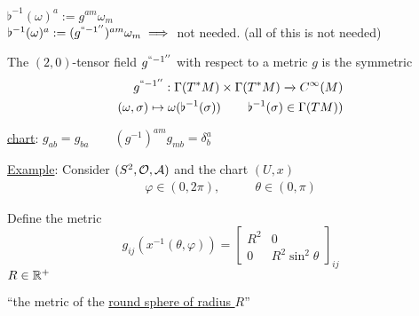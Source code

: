 $\flat^{-1}(\omega)^a := g^{am}\omega_m$ \\
$\flat^{-1}(\omega)^a := (g^{``-1''})^{am}\omega_m \implies$ not needed. (all of this is not needed)

\begin{definition}
The $(2,0)$-tensor field $g^{``-1''}$ with respect to a metric $g$ is the symmetric
\begin{align*}
  g^{``-1''} : \Gamma(T^*M) \times \Gamma(T^*M) \xrightarrow{ ~ } C^{\infty}(M) \\
  (\omega, \sigma) \mapsto \omega(\flat^{-1}(\sigma)) \quad \quad \, \flat^{-1}(\sigma) \in \Gamma(TM))
\end{align*}

\underline{chart}: $g_{ab} = g_{ba} \quad \quad (g^{-1})^{am} g_{mb} = \delta^a_b$
\end{definition}

\underline{Example}: Consider $(S^2, \mathcal{O}, \mathcal{A})$ and the chart $(U,x)$
\begin{align*}
\varphi \in (0,2\pi), & \quad \quad \theta \in (0,\pi)
\end{align*}

Define the metric \\
\[
g_{ij}(x^{-1}(\theta,\varphi)) = \left[ \begin{matrix} R^2 & 0 \\
    0 & R^2\sin^2{\theta} \end{matrix} \right]_{ij}
\]
$R \in \mathbb{R}^+$

``the metric of the \underline{round sphere of radius $R$}''

